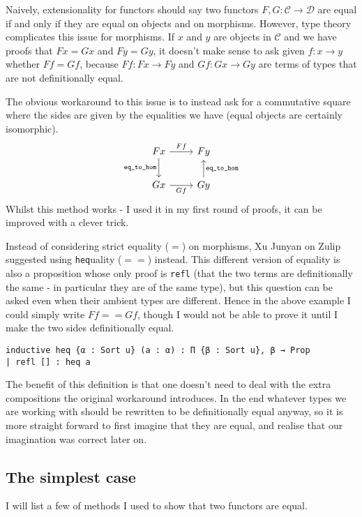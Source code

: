 \documentclass{article}
\newcommand{\CC}{\mathcal{C}}
\newcommand{\DD}{\mathcal{D}}
\newcommand{\<}{\langle}
\renewcommand{\>}{\rangle}
\theoremstyle{definitionstyle}
\theoremstyle{exercisestyle}
\theoremstyle{remarkstyle}
\begin{document}
Naively, extensionality for functors should say two functors $F, G : \CC \to \DD$
are equal if and only if they are equal on objects and on morphisms.
However, type theory complicates this issue for morphisms.
If $x$ and $y$ are objects in $\CC$ and we have proofs that $F x = G x$ and $F y = G y$,
it doesn't make sense to ask given $f : x \to y$ whether $F f = G f$,
because $F f : F x \to F y$ and $G f : G x \to G y$ are terms of types that are not definitionally equal.

The obvious workaround to this issue is to instead ask for a commutative square
where the sides are given by the equalities we have (equal objects are certainly isomorphic).
\[\begin{tikzcd}
	{F x} & {F y} \\
	Gx & Gy
	\arrow["{F f}", from=1-1, to=1-2]
	\arrow["{\texttt{eq\_to\_hom}}"', from=1-1, to=2-1]
	\arrow["Gf"', from=2-1, to=2-2]
	\arrow["{\texttt{eq\_to\_hom}}"', from=2-2, to=1-2]
\end{tikzcd}\]
Whilst this method works - I used it in my first round of proofs,
it can be improved with a clever trick.

Instead of considering strict equality ($=$) on morphisms,
Xu Junyan on Zulip suggested using \texttt{heq}uality ($==$) instead.
This different version of equality is also a proposition whose only
proof is \texttt{refl}
(that the two terms are definitionally the same - in particular they are of the same type),
but this question can be asked even when their ambient types are different.
Hence in the above example I could simply write $F f == G f$,
though I would not be able to prove it until I make the two sides
definitionally equal.

\begin{lstlisting}
inductive heq {α : Sort u} (a : α) : Π {β : Sort u}, β → Prop
| refl [] : heq a\end{lstlisting}

The benefit of this definition is that one doesn't need to deal with the
extra compositions the original workaround introduces.
In the end whatever types we are working with should be rewritten to be definitionally equal
anyway, so it is more straight forward to first imagine that they are equal,
and realise that our imagination was correct later on.

\subsection{The simplest case}
I will list a few of methods I used to show that two functors are equal.
\end{document}
